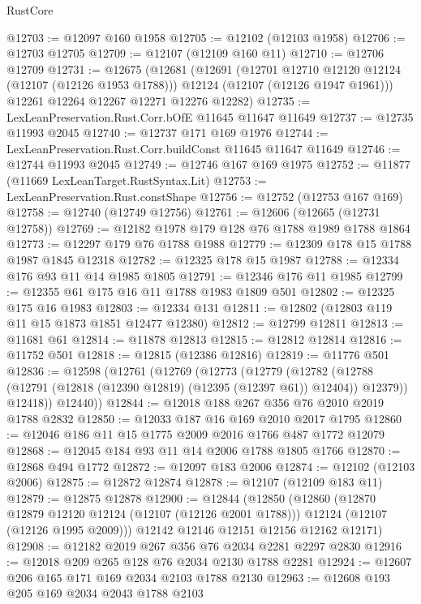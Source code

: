 \begin{lexlean}{RustCore}
\begin{coremodule}
@12703 := @12097 @160 @1958
@12705 := @12102 (@12103 @1958)
@12706 := @12703 @12705
@12709 := @12107 (@12109 @160 @11)
@12710 := @12706 @12709
@12731 := @12675
    (@12681
      (@12691
        (@12701 @12710 @12120 @12124 (@12107 (@12126 @1953 @1788)))
        @12124
        (@12107 (@12126 @1947 @1961)))
      @12261
      @12264
      @12267
      @12271
      @12276
      @12282)
@12735 := LexLeanPreservation.Rust.Corr.bOfE @11645 @11647 @11649
@12737 := @12735 @11993 @2045
@12740 := @12737 @171 @169 @1976
@12744 := LexLeanPreservation.Rust.Corr.buildConst @11645 @11647 @11649
@12746 := @12744 @11993 @2045
@12749 := @12746 @167 @169 @1975
@12752 := @11877 (@11669 LexLeanTarget.RustSyntax.Lit)
@12753 := LexLeanPreservation.Rust.constShape
@12756 := @12752 (@12753 @167 @169)
@12758 := @12740 (@12749 @12756)
@12761 := @12606 (@12665 (@12731 @12758))
@12769 := @12182 @1978 @179 @128 @76 @1788 @1989 @1788 @1864
@12773 := @12297 @179 @76 @1788 @1988
@12779 := @12309 @178 @15 @1788 @1987 @1845 @12318
@12782 := @12325 @178 @15 @1987
@12788 := @12334 @176 @93 @11 @14 @1985 @1805
@12791 := @12346 @176 @11 @1985
@12799 := @12355 @61 @175 @16 @11 @1788 @1983 @1809 @501
@12802 := @12325 @175 @16 @1983
@12803 := @12334 @131
@12811 := @12802 (@12803 @119 @11 @15 @1873 @1851 @12477 @12380)
@12812 := @12799 @12811
@12813 := @11681 @61
@12814 := @11878 @12813
@12815 := @12812 @12814
@12816 := @11752 @501
@12818 := @12815 (@12386 @12816)
@12819 := @11776 @501
@12836 := @12598
    (@12761
      (@12769
        (@12773
          (@12779
            (@12782 (@12788 (@12791 (@12818 (@12390 @12819) (@12395 (@12397 @61)) @12404)) @12379))
            @12418))
        @12440))
@12844 := @12018 @188 @267 @356 @76 @2010 @2019 @1788 @2832
@12850 := @12033 @187 @16 @169 @2010 @2017 @1795
@12860 := @12046 @186 @11 @15 @1775 @2009 @2016 @1766 @487 @1772 @12079
@12868 := @12045 @184 @93 @11 @14 @2006 @1788 @1805 @1766
@12870 := @12868 @494 @1772
@12872 := @12097 @183 @2006
@12874 := @12102 (@12103 @2006)
@12875 := @12872 @12874
@12878 := @12107 (@12109 @183 @11)
@12879 := @12875 @12878
@12900 := @12844
    (@12850
      (@12860
        (@12870 @12879 @12120 @12124 (@12107 (@12126 @2001 @1788)))
        @12124
        (@12107 (@12126 @1995 @2009)))
      @12142
      @12146
      @12151
      @12156
      @12162
      @12171)
@12908 := @12182 @2019 @267 @356 @76 @2034 @2281 @2297 @2830
@12916 := @12018 @209 @265 @128 @76 @2034 @2130 @1788 @2281
@12924 := @12607 @206 @165 @171 @169 @2034 @2103 @1788 @2130
@12963 := @12608
    @193
    @205
    @169
    @2034
    @2043
    @1788
    @2103

\end{coremodule}
\end{lexlean}
